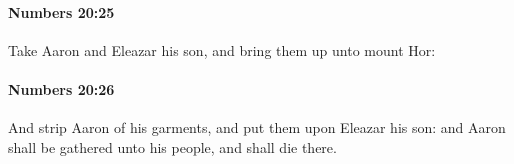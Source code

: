 		\paragraph{Numbers 20:25} %
			\label{NUMBERS-20-25}

			Take Aaron and Eleazar his son, and bring them up unto mount Hor:


		\paragraph{Numbers 20:26} %
			\label{NUMBERS-20-26}

			And strip Aaron of his garments, and put them upon Eleazar his son: and Aaron shall be gathered unto his people, and shall die there.


